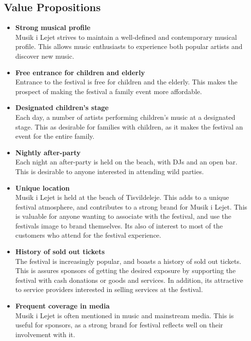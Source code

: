 \subsection{Value Propositions} %
\label{sub:value_propositions}
\begin{itemize}
(baseret på møde med kristian og stakke)
	\item \textbf{Strong musical profile}\\
	 Musik i Lejet strives to maintain a well-defined and contemporary musical profile. This allows music enthusiasts to experience both popular artists and discover new music.
	\item \textbf{Free entrance for children and elderly}\\
	Entrance to the festival is free for children and the elderly. This makes the prospect of making the festival a family event more affordable.
	\item \textbf{Designated children's stage}\\
	Each day, a number of artists performing children's music at a designated stage. This as desirable for families with children, as it makes the festival an event for the entire family.
	\item \textbf{Nightly after-party}\\
	Each night an after-party is held on the beach, with DJs and an open bar. This is desirable to anyone interested in attending wild parties.
	\item \textbf{Unique location}\\
	Musik i Lejet is held at the beach of Tisvildeleje. This adds to a unique festival atmosphere, and contributes to a strong brand for Musik i Lejet. This is valuable for anyone wanting to associate with the festival, and use the festivals image to brand themselves. Its also of interest to most of the customers who attend for the festival experience.
	\item \textbf{History of sold out tickets}\\
	The festival is increasingly popular, and boasts a history of sold out tickets. This is assures sponsors of getting the desired exposure by supporting the festival with cash donations or goods and services. In addition, its attractive to service providers interested in selling services at the festival.
	\item \textbf{Frequent coverage in media}\\
	Musik i Lejet is often mentioned in music and mainstream media. This is useful for sponsors, as a strong brand for festival reflects well on their involvement with it.
\end{itemize}
